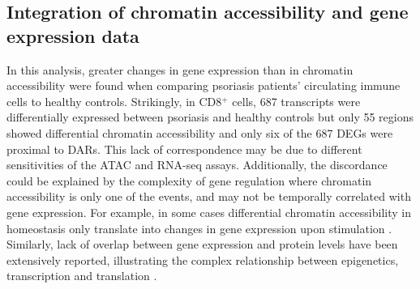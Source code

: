 



\subsection{Integration of chromatin accessibility and gene expression data}
In this analysis, greater changes in gene expression than in chromatin accessibility were found when comparing psoriasis patients' circulating immune cells to healthy controls. Strikingly, in CD8$^+$ cells, 687 transcripts were differentially expressed between psoriasis and healthy controls but only 55 regions showed differential chromatin accessibility and only six of the 687 DEGs were proximal to DARs. This lack of correspondence may be due to different sensitivities of the ATAC and RNA-seq assays. Additionally, the discordance could be explained by the complexity of gene regulation where chromatin accessibility is only one of the events, and may not be temporally correlated with gene expression. For example, in some cases differential chromatin accessibility in homeostasis only translate into changes in gene expression upon stimulation \parencite{Alasoo2018,Calderon2018}. Similarly, lack of overlap between gene expression and protein levels have been extensively reported, illustrating the complex relationship between epigenetics, transcription and translation \parencite{Liu2016}. 




